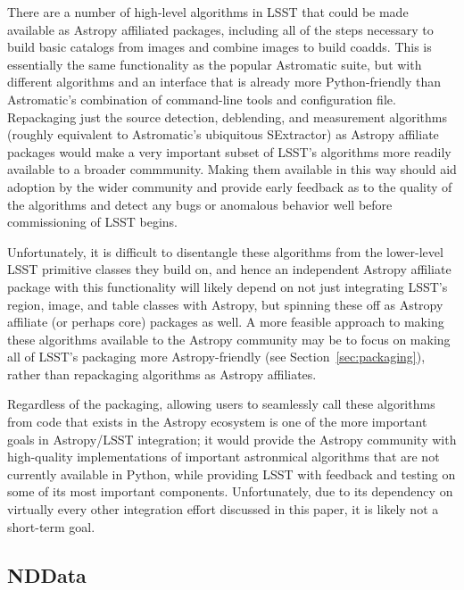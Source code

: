 \documentclass[]{spie}  %
\begin{document}
There are a number of high-level algorithms in LSST that could be made available as Astropy affiliated packages\cite{bosch_2016_48435}, including all of the steps necessary to build basic catalogs from images and combine images to build coadds.
This is essentially the same functionality as the popular Astromatic suite\cite{2012ASSP...29...71B}, but with different algorithms and an interface that is already more Python-friendly than Astromatic's combination of command-line tools and configuration file.
Repackaging just the source detection, deblending, and measurement algorithms (roughly equivalent to Astromatic's ubiquitous SExtractor) as Astropy affiliate packages would make a very important subset of LSST's algorithms more readily available to a broader commmunity.
Making them available in this way should aid adoption by the wider community and provide early feedback as to the quality of the algorithms and detect any bugs or anomalous behavior well before commissioning of LSST begins.

Unfortunately, it is difficult to disentangle these algorithms from the lower-level LSST primitive classes they build on, and hence an independent Astropy affiliate package with this functionality will likely depend on not just integrating LSST's region, image, and table classes with Astropy, but spinning these off as Astropy affiliate (or perhaps core) packages as well.
A more feasible approach to making these algorithms available to the Astropy community may be to focus on making all of LSST's packaging more Astropy-friendly (see Section~\ref{sec:packaging}), rather than repackaging algorithms as Astropy affiliates.

Regardless of the packaging, allowing users to seamlessly call these algorithms from code that exists in the Astropy ecosystem is one of the more important goals in Astropy/LSST integration; it would provide the Astropy community with high-quality implementations of important astronmical algorithms that are not currently available in Python, while providing LSST with feedback and testing on some of its most important components.
Unfortunately, due to its dependency on virtually every other integration effort discussed in this paper, it is likely not a short-term goal.

\subsection{NDData}
\end{document}
